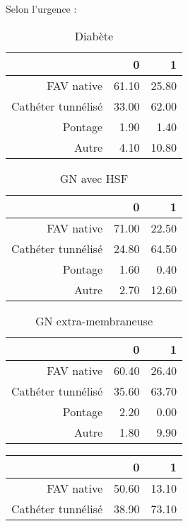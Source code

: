 \documentclass[11pt,a4paper]{article}\usepackage[]{graphicx}\usepackage[]{color}
\begin{document}
Selon l'urgence :
\begin{multicols}{2}
\begin{table}[H]
\centering
\begin{tabular}{rrr}
  \hline
 & 0 & 1 \\ 
  \hline
FAV native & 61.10 & 25.80 \\ 
  Cathéter tunnélisé & 33.00 & 62.00 \\ 
  Pontage & 1.90 & 1.40 \\ 
  Autre & 4.10 & 10.80 \\ 
   \hline
\end{tabular}
\caption{Diabète} 
\end{table}
\begin{table}[H]
\centering
\begin{tabular}{rrr}
  \hline
 & 0 & 1 \\ 
  \hline
FAV native & 71.00 & 22.50 \\ 
  Cathéter tunnélisé & 24.80 & 64.50 \\ 
  Pontage & 1.60 & 0.40 \\ 
  Autre & 2.70 & 12.60 \\ 
   \hline
\end{tabular}
\caption{GN avec HSF} 
\end{table}
\begin{table}[H]
\centering
\begin{tabular}{rrr}
  \hline
 & 0 & 1 \\ 
  \hline
FAV native & 60.40 & 26.40 \\ 
  Cathéter tunnélisé & 35.60 & 63.70 \\ 
  Pontage & 2.20 & 0.00 \\ 
  Autre & 1.80 & 9.90 \\ 
   \hline
\end{tabular}
\caption{GN extra-membraneuse} 
\end{table}
\begin{table}[H]
\centering
\begin{tabular}{rrr}
  \hline
 & 0 & 1 \\ 
  \hline
FAV native & 50.60 & 13.10 \\ 
  Cathéter tunnélisé & 38.90 & 73.10 \\ 

\end{tabular}
\end{table}
\end{multicols}
\end{document}
